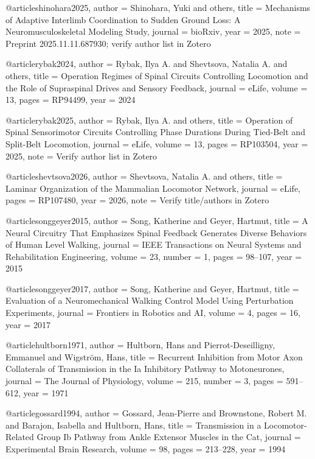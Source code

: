 @article{shinohara2025,
  author  = {Shinohara, Yuki and others},
  title   = {Mechanisms of Adaptive Interlimb Coordination to Sudden Ground Loss: A Neuromusculoskeletal Modeling Study},
  journal = {bioRxiv},
  year    = {2025},
  note    = {Preprint 2025.11.11.687930; verify author list in Zotero}
}

@article{rybak2024,
  author  = {Rybak, Ilya A. and Shevtsova, Natalia A. and others},
  title   = {Operation Regimes of Spinal Circuits Controlling Locomotion and the Role of Supraspinal Drives and Sensory Feedback},
  journal = {eLife},
  volume  = {13},
  pages   = {RP94499},
  year    = {2024}
}

@article{rybak2025,
  author  = {Rybak, Ilya A. and others},
  title   = {Operation of Spinal Sensorimotor Circuits Controlling Phase Durations During Tied-Belt and Split-Belt Locomotion},
  journal = {eLife},
  volume  = {13},
  pages   = {RP103504},
  year    = {2025},
  note    = {Verify author list in Zotero}
}

@article{shevtsova2026,
  author  = {Shevtsova, Natalia A. and others},
  title   = {Laminar Organization of the Mammalian Locomotor Network},
  journal = {eLife},
  pages   = {RP107480},
  year    = {2026},
  note    = {Verify title/authors in Zotero}
}

@article{songgeyer2015,
  author  = {Song, Katherine and Geyer, Hartmut},
  title   = {A Neural Circuitry That Emphasizes Spinal Feedback Generates Diverse Behaviors of Human Level Walking},
  journal = {IEEE Transactions on Neural Systems and Rehabilitation Engineering},
  volume  = {23},
  number  = {1},
  pages   = {98--107},
  year    = {2015}
}

@article{songgeyer2017,
  author  = {Song, Katherine and Geyer, Hartmut},
  title   = {Evaluation of a Neuromechanical Walking Control Model Using Perturbation Experiments},
  journal = {Frontiers in Robotics and AI},
  volume  = {4},
  pages   = {16},
  year    = {2017}
}

@article{hultborn1971,
  author  = {Hultborn, Hans and Pierrot-Deseilligny, Emmanuel and Wigstr{\"o}m, Hans},
  title   = {Recurrent Inhibition from Motor Axon Collaterals of Transmission in the Ia Inhibitory Pathway to Motoneurones},
  journal = {The Journal of Physiology},
  volume  = {215},
  number  = {3},
  pages   = {591--612},
  year    = {1971}
}

@article{gossard1994,
  author  = {Gossard, Jean-Pierre and Brownstone, Robert M. and Barajon, Isabella and Hultborn, Hans},
  title   = {Transmission in a Locomotor-Related Group Ib Pathway from Ankle Extensor Muscles in the Cat},
  journal = {Experimental Brain Research},
  volume  = {98},
  pages   = {213--228},
  year    = {1994}
}

